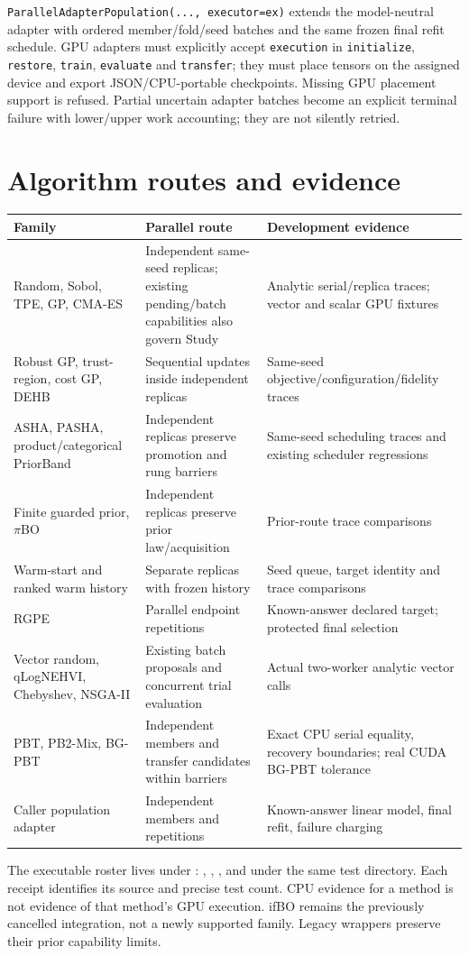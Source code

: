 \texttt{ParallelAdapterPopulation(..., executor=ex)} extends the model-neutral
adapter with ordered member/fold/seed batches and the same frozen final refit
schedule. GPU adapters must explicitly accept \texttt{execution} in
\texttt{initialize}, \texttt{restore}, \texttt{train}, \texttt{evaluate} and
\texttt{transfer}; they must place tensors on the assigned device and export
JSON/CPU-portable checkpoints. Missing GPU placement support is refused.
Partial uncertain adapter batches become an explicit terminal failure with
lower/upper work accounting; they are not silently retried.

\section{Algorithm routes and evidence}
\begin{longtable}{p{}p{}p{}}
\toprule Family & Parallel route & Development evidence \\
\midrule\endhead
Random, Sobol, TPE, GP, CMA-ES & Independent same-seed replicas; existing pending/batch capabilities also govern Study & Analytic serial/replica traces; vector and scalar GPU fixtures \\
Robust GP, trust-region, cost GP, DEHB & Sequential updates inside independent replicas & Same-seed objective/configuration/fidelity traces \\
ASHA, PASHA, product/categorical PriorBand & Independent replicas preserve promotion and rung barriers & Same-seed scheduling traces and existing scheduler regressions \\
Finite guarded prior, $\pi$BO & Independent replicas preserve prior law/acquisition & Prior-route trace comparisons \\
Warm-start and ranked warm history & Separate replicas with frozen history & Seed queue, target identity and trace comparisons \\
RGPE & Parallel endpoint repetitions & Known-answer declared target; protected final selection \\
Vector random, qLogNEHVI, Chebyshev, NSGA-II & Existing batch proposals and concurrent trial evaluation & Actual two-worker analytic vector calls \\
PBT, PB2-Mix, BG-PBT & Independent members and transfer candidates within barriers & Exact CPU serial equality, recovery boundaries; real CUDA BG-PBT tolerance \\
Caller population adapter & Independent members and repetitions & Known-answer linear model, final refit, failure charging \\
\bottomrule
\end{longtable}
The executable roster lives under : ,
, ,
 and  under the
same test directory. Each receipt identifies its source and precise test count.
CPU evidence for a method is not evidence of that method's GPU execution.
ifBO remains the previously cancelled integration, not a newly supported family.
Legacy wrappers preserve their prior capability limits.

